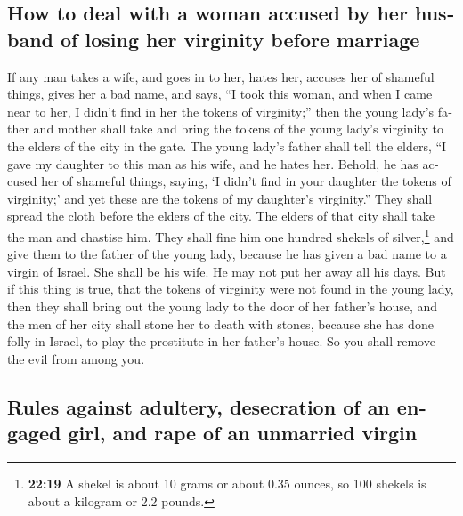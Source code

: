 \begin{paracol}{2}
\begin{otherlanguage}{english}
\hypertarget{how-to-deal-with-a-woman-accused-by-her-husband-of-losing-her-virginity-before-marriage}{%
\subsection{How to deal with a woman accused by her husband of losing
her virginity before
marriage}\label{how-to-deal-with-a-woman-accused-by-her-husband-of-losing-her-virginity-before-marriage}}

 If any man takes a wife, and goes in to her, hates her,
 accuses her of shameful things, gives her a bad name,
and says, ``I took this woman, and when I came near to her, I didn't
find in her the tokens of virginity;''  then the young
lady's father and mother shall take and bring the tokens of the young
lady's virginity to the elders of the city in the gate. 
The young lady's father shall tell the elders, ``I gave my daughter to
this man as his wife, and he hates her.  Behold, he has
accused her of shameful things, saying, `I didn't find in your daughter
the tokens of virginity;' and yet these are the tokens of my daughter's
virginity.'' They shall spread the cloth before the elders of the city.
 The elders of that city shall take the man and chastise
him.  They shall fine him one hundred shekels of
silver,\footnote{\textbf{22:19} A shekel is about 10 grams or about 0.35
  ounces, so 100 shekels is about a kilogram or 2.2 pounds.} and give
them to the father of the young lady, because he has given a bad name to
a virgin of Israel. She shall be his wife. He may not put her away all
his days.  But if this thing is true, that the tokens of
virginity were not found in the young lady,  then they
shall bring out the young lady to the door of her father's house, and
the men of her city shall stone her to death with stones, because she
has done folly in Israel, to play the prostitute in her father's house.
So you shall remove the evil from among you.

\hypertarget{rules-against-adultery-desecration-of-an-engaged-girl-and-rape-of-an-unmarried-virgin}{%
\subsection{Rules against adultery, desecration of an engaged girl, and
rape of an unmarried
virgin}\label{rules-against-adultery-desecration-of-an-engaged-girl-and-rape-of-an-unmarried-virgin}}


\end{otherlanguage}
\end{paracol}
